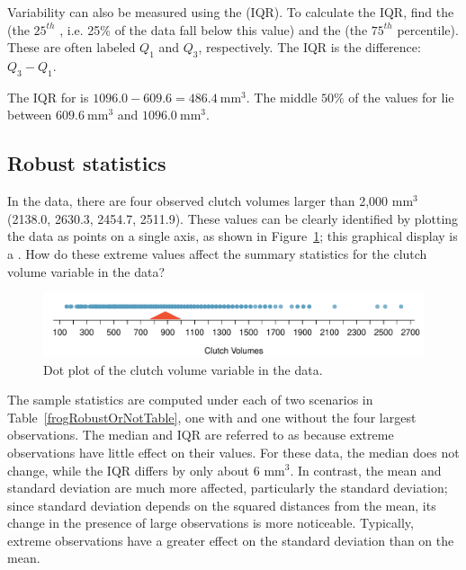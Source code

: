 Variability can also be measured using the  (IQR).  To calculate the IQR, find the   (the $25^{th}$ , i.e. 25\% of the data fall below this value) and the   (the $75^{th}$ percentile). These are often labeled $Q_1$ and $Q_3$, respectively. The IQR is the difference: $Q_3 - Q_1$.

The IQR for  is $1096.0 - 609.6 = 486.4\ \textrm{mm}^{3}$.  The middle $50\%$ of the values for  lie between $609.6\ \textrm{mm}^{3}$ and $1096.0\ \textrm{mm}^{3}$.

\subsection{Robust statistics}

In the  data, there are four observed clutch volumes larger than 2,000 $\textrm{mm}^{3}$ (2138.0, 2630.3, 2454.7, 2511.9). These values can be clearly identified by plotting the data as points on a single axis, as shown in Figure~\ref{frogClutchVolDotPlot}; this graphical display is a . How do these extreme values affect the summary statistics for the clutch volume variable in the  data?

\begin{figure}[ht]
	\centering
	\includegraphics[width=\textwidth]{ch_intro_to_data_oi_biostat/figures/frogClutchVolDotPlot/frogClutchVolDotPlot}
	\caption{Dot plot of the clutch volume variable in the  data.}
	\label{frogClutchVolDotPlot}
\end{figure}

The sample statistics are computed under each of two scenarios in Table~\ref{frogRobustOrNotTable}, one with and one without the four largest observations. The median and IQR are referred to as  because extreme observations have little effect on their values. For these data, the median does not change, while the IQR differs by only about 6 $\textrm{mm}^{3}$. In contrast, the mean and standard deviation are much more affected, particularly the standard deviation; since standard deviation depends on the squared distances from the mean, its change in the presence of large observations is more noticeable. Typically, extreme observations have a greater effect on the standard deviation than on the mean.

